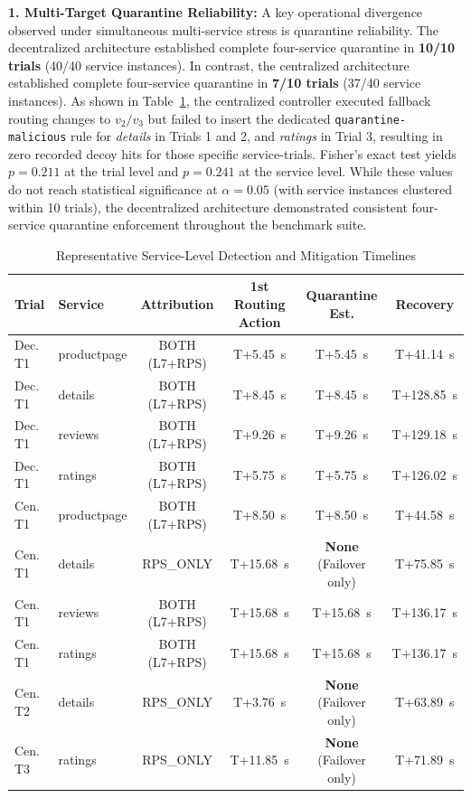 \textbf{1. Multi-Target Quarantine Reliability:} A key operational divergence observed under simultaneous multi-service stress is quarantine reliability. The decentralized architecture established complete four-service quarantine in \textbf{10/10 trials} (40/40 service instances). In contrast, the centralized architecture established complete four-service quarantine in \textbf{7/10 trials} (37/40 service instances). As shown in Table~\ref{tab:scenario2_timeline}, the centralized controller executed fallback routing changes to $v_2/v_3$ but failed to insert the dedicated \texttt{quarantine-malicious} rule for \textit{details} in Trials 1 and 2, and \textit{ratings} in Trial 3, resulting in zero recorded decoy hits for those specific service-trials. Fisher's exact test yields $p = 0.211$ at the trial level and $p = 0.241$ at the service level. While these values do not reach statistical significance at $\alpha = 0.05$ (with service instances clustered within 10 trials), the decentralized architecture demonstrated consistent four-service quarantine enforcement throughout the benchmark suite.

\begin{table}[htbp]
\renewcommand{\arraystretch}{1.2}
\caption{Representative Service-Level Detection and Mitigation Timelines}
\label{tab:scenario2_timeline}
\centering
\footnotesize
\setlength{\tabcolsep}{3pt}
\begin{tabular}{llcccc}
\hline
\textbf{Trial} & \textbf{Service} & \textbf{Attribution} & \textbf{1st Routing Action} & \textbf{Quarantine Est.} & \textbf{Recovery} \\
\hline
Dec. T1  & productpage & BOTH (L7+RPS) & T+5.45~s  & T+5.45~s  & T+41.14~s \\
Dec. T1  & details     & BOTH (L7+RPS) & T+8.45~s  & T+8.45~s  & T+128.85~s \\
Dec. T1  & reviews     & BOTH (L7+RPS) & T+9.26~s  & T+9.26~s  & T+129.18~s \\
Dec. T1  & ratings     & BOTH (L7+RPS) & T+5.75~s  & T+5.75~s  & T+126.02~s \\
\hline
Cen. T1  & productpage & BOTH (L7+RPS) & T+8.50~s  & T+8.50~s  & T+44.58~s \\
Cen. T1  & details     & RPS\_ONLY     & T+15.68~s & \textbf{None} (Failover only) & T+75.85~s \\
Cen. T1  & reviews     & BOTH (L7+RPS) & T+15.68~s & T+15.68~s & T+136.17~s \\
Cen. T1  & ratings     & BOTH (L7+RPS) & T+15.68~s & T+15.68~s & T+136.17~s \\
\hline
Cen. T2  & details     & RPS\_ONLY     & T+3.76~s  & \textbf{None} (Failover only) & T+63.89~s \\
Cen. T3  & ratings     & RPS\_ONLY     & T+11.85~s & \textbf{None} (Failover only) & T+71.89~s \\
\hline
\end{tabular}
\end{table}

